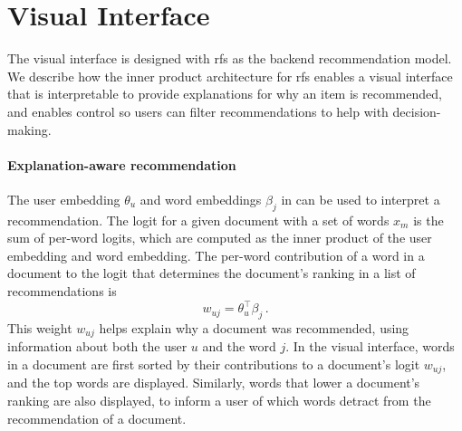 \section{Visual Interface}

The visual interface is designed with \gls{rfs} as the backend recommendation model. We describe how the inner product architecture for \gls{rfs} enables a visual interface that is interpretable to provide explanations for why an item is recommended, and enables control so users can filter recommendations to help with decision-making.

\paragraph{Explanation-aware recommendation} The user embedding $\theta_u$ and word embeddings $\beta_j$ in  can be used to interpret a recommendation. The logit for a given document with a set of words $x_m$ is the sum of per-word logits, which are computed as the inner product of the user embedding and word embedding. The per-word contribution of a word in a document to the logit that determines the document's ranking in a list of recommendations is
\begin{equation}
  w_{uj} = \theta_u^\top \beta_j\, .
  \label{eq:word-weight}
\end{equation}
This weight $w_{uj}$ helps explain why a document was recommended, using information about both the user $u$ and the word $j$. In the visual interface, words in a document are first sorted by their contributions to a document's logit $w_{uj}$, and the top words are displayed. Similarly, words that lower a document's ranking are also displayed, to inform a user of which words detract from the recommendation of a document.

